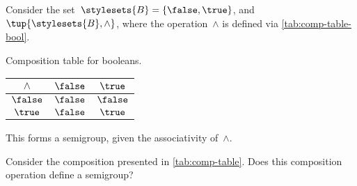 \begin{example}[Booleans]
    \label{exa:booleans-table}
    \label{ex:bool_semigroup}
    Consider the set~$\stylesets{B}=\{\false, \true\}$, and~$\tup{\stylesets{B},\wedge}$, where the operation~$\wedge$ is defined via \cref{tab:comp-table-bool}.
    
    \begin{margintable}
        \caption{Composition table for booleans.}
        \label{tab:comp-table-bool}
        \begin{tabular}{c|cc}
            $\wedge$ & $\false$ & $\true$  \\
            \hline
            $\false$ & $\false$ & $\false$ \\
            $\true$  & $\false$ & $\true$
        \end{tabular}
    \end{margintable}
    
    This forms a semigroup, given the associativity of~$\wedge$.
\end{example}

\begin{gradedexercise}
    \label{ex:CompositionTable}
    Consider the composition presented in \cref{tab:comp-table}.
    Does this composition operation define a semigroup?
\end{gradedexercise}

